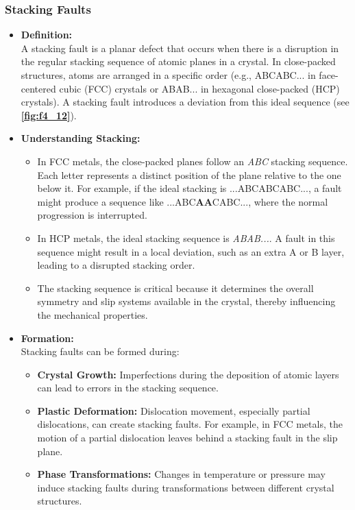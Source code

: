 \subsubsection{Stacking Faults}
\begin{itemize}
  \item \textbf{Definition:} \\
    A stacking fault is a planar defect that occurs when there is a disruption in the regular stacking sequence of atomic planes in a crystal. In close-packed structures, atoms are arranged in a specific order (e.g., ABCABC... in face-centered cubic (FCC) crystals or ABAB... in hexagonal close-packed (HCP) crystals). A stacking fault introduces a deviation from this ideal sequence (see \textbf{\autoref{fig:f4_12}}).
  \item \textbf{Understanding Stacking:}
    \begin{itemize}
      \item In FCC metals, the close-packed planes follow an \textit{ABC} stacking sequence. Each letter represents a distinct position of the plane relative to the one below it. For example, if the ideal stacking is ...ABCABCABC..., a fault might produce a sequence like ...ABC\textbf{AA}CABC..., where the normal progression is interrupted.
      \item In HCP metals, the ideal stacking sequence is \textit{ABAB...}. A fault in this sequence might result in a local deviation, such as an extra A or B layer, leading to a disrupted stacking order.
      \item The stacking sequence is critical because it determines the overall symmetry and slip systems available in the crystal, thereby influencing the mechanical properties.
    \end{itemize}
  \item \textbf{Formation:} \\
    Stacking faults can be formed during:
    \begin{itemize}
      \item \textbf{Crystal Growth:} Imperfections during the deposition of atomic layers can lead to errors in the stacking sequence.
      \item \textbf{Plastic Deformation:} Dislocation movement, especially partial dislocations, can create stacking faults. For example, in FCC metals, the motion of a partial dislocation leaves behind a stacking fault in the slip plane.
      \item \textbf{Phase Transformations:} Changes in temperature or pressure may induce stacking faults during transformations between different crystal structures.

\end{itemize}
\end{itemize}
